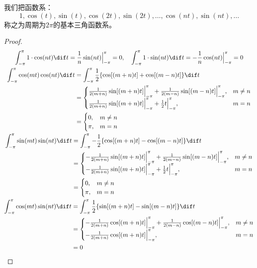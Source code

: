 \begin{definition}
	我们把函数系：
	\begin{equation*}
		1,\cos(t),\sin(t),\cos(2t),\sin(2t),\dots,\cos(nt),\sin(nt),\dots
	\end{equation*}
	称之为周期为$2\pi$的基本三角函数系。
\end{definition}
\begin{proof}
	\begin{gather*}
		\int_{-\pi}^{\pi}1\cdot\cos(nt)\dif t=\frac{1}{n}\sin(nt)\Big|_{-\pi}^{\pi}=0,\quad
		\int_{-\pi}^{\pi}1\cdot\sin(nt)\dif t=-\frac{1}{n}\cos(nt)\Big|_{-\pi}^{\pi}=0 \\
		\begin{align*}
			\int_{-\pi}^{\pi}\cos(mt)\cos(nt)\dif t
			&=\int_{-\pi}^{\pi}\frac{1}{2}\{\cos[(m+n)t]+\cos[(m-n)t]\}\dif t \\
			&=
			\begin{cases}
				\frac{1}{2(m+n)}\sin[(m+n)t]\Big|_{-\pi}^{\pi}+\frac{1}{2(m-n)}\sin[(m-n)t]\Big|_{-\pi}^{\pi},&m\ne n \\
				\frac{1}{2(m+n)}\sin[(m+n)t]\Big|_{-\pi}^{\pi}+\frac{1}{2}t\Big|_{-\pi}^{\pi},&m=n
			\end{cases}
			 \\
			&=
			\begin{cases}
				0,&m\ne n \\
				\pi,&m=n
			\end{cases}
		\end{align*} \\
		\begin{align*}
			\int_{-\pi}^{\pi}\sin(mt)\sin(nt)\dif t
			&=\int_{-\pi}^{\pi}-\frac{1}{2}\{\cos[(m+n)t]-\cos[(m-n)t]\}\dif t \\
			&=
			\begin{cases}
				-\frac{1}{2(m+n)}\sin[(m+n)t]\Big|_{-\pi}^{\pi}+\frac{1}{2(m-n)}\sin[(m-n)t]\Big|_{-\pi}^{\pi},&m\ne n \\
				-\frac{1}{2(m+n)}\sin[(m+n)t]\Big|_{-\pi}^{\pi}+\frac{1}{2}t\Big|_{-\pi}^{\pi},&m=n
			\end{cases}
			\\
			&=
			\begin{cases}
				0,&m\ne n \\
				\pi,&m=n
			\end{cases}
		\end{align*} \\
		\begin{align*}
			\int_{-\pi}^{\pi}\cos(mt)\sin(nt)\dif t
			&=\int_{-\pi}^{\pi}\frac{1}{2}\{\sin[(m+n)t]-\sin[(m-n)t]\}\dif t \\
			&=
			\begin{cases}
				-\frac{1}{2(m+n)}\cos[(m+n)t]\Big|_{-\pi}^{\pi}+\frac{1}{2(m-n)}\cos[(m-n)t]\Big|_{-\pi}^{\pi},&m\ne n \\
				-\frac{1}{2(m+n)}\cos[(m+n)t]\Big|_{-\pi}^{\pi},&m=n
			\end{cases} \\
			&=0
		\end{align*}
	\end{gather*}
\end{proof}